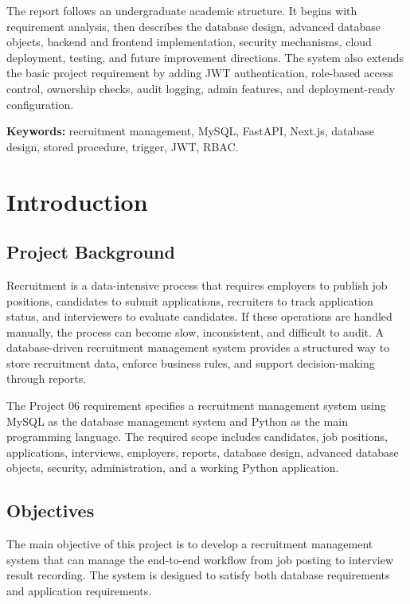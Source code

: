 \documentclass[12pt,a4paper]{report}
\begin{document}
The report follows an undergraduate academic structure. It begins with requirement analysis, then describes the database design, advanced database objects, backend and frontend implementation, security mechanisms, cloud deployment, testing, and future improvement directions. The system also extends the basic project requirement by adding JWT authentication, role-based access control, ownership checks, audit logging, admin features, and deployment-ready configuration.

\noindent\textbf{Keywords:} recruitment management, MySQL, FastAPI, Next.js, database design, stored procedure, trigger, JWT, RBAC.

\tableofcontents
\listoffigures
\listoftables
\clearpage
{}

\chapter{Introduction}

\section{Project Background}

Recruitment is a data-intensive process that requires employers to publish job positions, candidates to submit applications, recruiters to track application status, and interviewers to evaluate candidates. If these operations are handled manually, the process can become slow, inconsistent, and difficult to audit. A database-driven recruitment management system provides a structured way to store recruitment data, enforce business rules, and support decision-making through reports.

The Project 06 requirement specifies a recruitment management system using MySQL as the database management system and Python as the main programming language. The required scope includes candidates, job positions, applications, interviews, employers, reports, database design, advanced database objects, security, administration, and a working Python application.

\section{Objectives}

The main objective of this project is to develop a recruitment management system that can manage the end-to-end workflow from job posting to interview result recording. The system is designed to satisfy both database requirements and application requirements.
\end{document}
